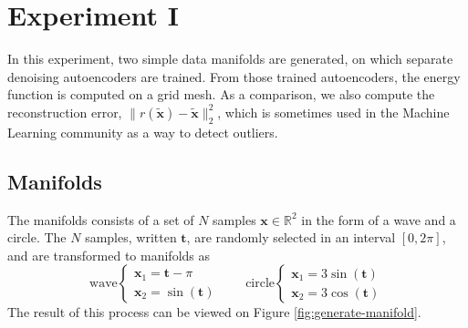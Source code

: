 
\section{Experiment I}\label{sec:experiment-I}
In this experiment, two simple data manifolds are generated, on which separate denoising autoencoders are trained. From those trained autoencoders, the energy function is computed on a grid mesh. As a comparison, we also compute the reconstruction error, $\lVert r(\tilde{\mathbf{x}}) - \tilde{\mathbf{x}} \rVert_2^2$, which is sometimes used in the Machine Learning community as a way to detect outliers. 
\subsection*{Manifolds}
The manifolds consists of a set of $N$ samples $\mathbf{x} \in \mathbb{R}^2$ in the form of a wave and a circle. The $N$ samples, written $\mathbf{t}$, are randomly selected in an interval $[0, 2\pi]$, and are transformed to manifolds as
$$
\text{wave}  \begin{cases}
      \mathbf{x}_1 = \mathbf{t} - \pi \\
      \mathbf{x}_2 = \sin(\mathbf{t})
    \end{cases}  \qquad \text{circle}  \begin{cases}
      \mathbf{x}_1 = 3\sin(\mathbf{t}) \\
      \mathbf{x}_2 = 3\cos(\mathbf{t})
    \end{cases}
$$
The result of this process can be viewed on Figure \ref{fig:generate-manifold}.
